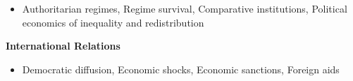 \documentclass[
  16,
]{article}
\providecommand{\tightlist}{%
  \setlength{\itemsep}{0pt}\setlength{\parskip}{0pt}}\usepackage{longtable,booktabs,array}
\begin{document}
\begin{itemize}
\tightlist
\item
  Authoritarian regimes, Regime survival, Comparative institutions,
  Political economics of inequality and redistribution
\end{itemize}

\vspace{7pt}

\begin{large}
  \begin{multicols}{2}
    \begin{flushleft}{\bf International Relations}\end{flushleft}
    \begin{flushright}\end{flushright}
  \end{multicols}
\end{large}
\vspace{-0.16cm}

\begin{itemize}
\tightlist
\item
  Democratic diffusion, Economic shocks, Economic sanctions, Foreign
  aids
\end{itemize}

\vspace{7pt}
\end{document}

